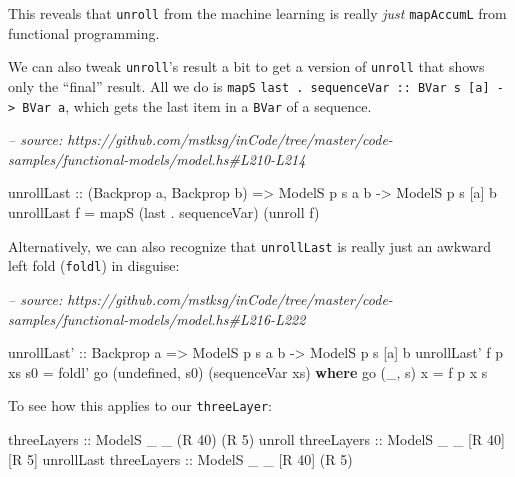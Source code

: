 \documentclass[]{article}
\newenvironment{Shaded}{}{}
\newcommand{\CommentTok}[1]{\textcolor[rgb]{0.38,0.63,0.69}{\textit{#1}}}
\newcommand{\DataTypeTok}[1]{\textcolor[rgb]{0.56,0.13,0.00}{#1}}
\newcommand{\DecValTok}[1]{\textcolor[rgb]{0.25,0.63,0.44}{#1}}
\newcommand{\FunctionTok}[1]{\textcolor[rgb]{0.02,0.16,0.49}{#1}}
\newcommand{\KeywordTok}[1]{\textcolor[rgb]{0.00,0.44,0.13}{\textbf{#1}}}
\newcommand{\NormalTok}[1]{#1}
\newcommand{\OtherTok}[1]{\textcolor[rgb]{0.00,0.44,0.13}{#1}}
\begin{document}
This reveals that \texttt{unroll} from the machine learning is really
\emph{just} \texttt{mapAccumL} from functional programming.

We can also tweak \texttt{unroll}'s result a bit to get a version of
\texttt{unroll} that shows only the ``final'' result. All we do is \texttt{mapS}
\texttt{last\ .\ sequenceVar\ ::\ BVar\ s\ {[}a{]}\ -\textgreater{}\ BVar\ a},
which gets the last item in a \texttt{BVar} of a sequence.

\begin{Shaded}
\begin{Highlighting}[]
\CommentTok{-- source: https://github.com/mstksg/inCode/tree/master/code-samples/functional-models/model.hs#L210-L214}

\NormalTok{unrollLast}
\OtherTok{    ::}\NormalTok{ (}\DataTypeTok{Backprop}\NormalTok{ a, }\DataTypeTok{Backprop}\NormalTok{ b)}
    \OtherTok{=>} \DataTypeTok{ModelS}\NormalTok{ p s  a  b}
    \OtherTok{->} \DataTypeTok{ModelS}\NormalTok{ p s [a] b}
\NormalTok{unrollLast f }\FunctionTok{=}\NormalTok{ mapS (last }\FunctionTok{.}\NormalTok{ sequenceVar) (unroll f)}
\end{Highlighting}
\end{Shaded}

Alternatively, we can also recognize that \texttt{unrollLast} is really just an
awkward left fold (\texttt{foldl}) in disguise:

\begin{Shaded}
\begin{Highlighting}[]
\CommentTok{-- source: https://github.com/mstksg/inCode/tree/master/code-samples/functional-models/model.hs#L216-L222}

\NormalTok{unrollLast'}
\OtherTok{    ::} \DataTypeTok{Backprop}\NormalTok{ a}
    \OtherTok{=>} \DataTypeTok{ModelS}\NormalTok{ p s  a  b}
    \OtherTok{->} \DataTypeTok{ModelS}\NormalTok{ p s [a] b}
\NormalTok{unrollLast' f p xs s0 }\FunctionTok{=}\NormalTok{ foldl' go (undefined, s0) (sequenceVar xs)}
  \KeywordTok{where}
\NormalTok{    go (_, s) x }\FunctionTok{=}\NormalTok{ f p x s}
\end{Highlighting}
\end{Shaded}

To see how this applies to our \texttt{threeLayer}:

\begin{Shaded}
\begin{Highlighting}[]
\OtherTok{threeLayers            ::} \DataTypeTok{ModelS}\NormalTok{ _ _ (}\DataTypeTok{R} \DecValTok{40}\NormalTok{) (}\DataTypeTok{R} \DecValTok{5}\NormalTok{)}
\NormalTok{unroll}\OtherTok{     threeLayers ::} \DataTypeTok{ModelS}\NormalTok{ _ _ [}\DataTypeTok{R} \DecValTok{40}\NormalTok{] [}\DataTypeTok{R} \DecValTok{5}\NormalTok{]}
\NormalTok{unrollLast}\OtherTok{ threeLayers ::} \DataTypeTok{ModelS}\NormalTok{ _ _ [}\DataTypeTok{R} \DecValTok{40}\NormalTok{] (}\DataTypeTok{R} \DecValTok{5}\NormalTok{)}
\end{Highlighting}
\end{Shaded}
\end{document}
